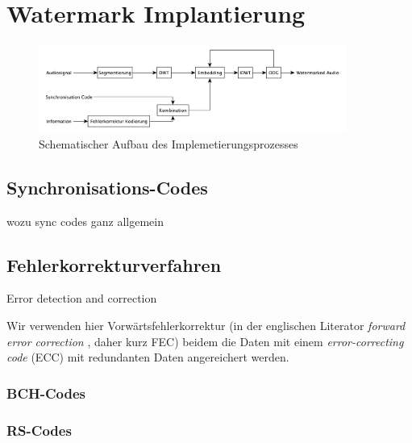 \section{Watermark Implantierung}
\label{sec:embedding}

\begin{figure}[tb]
	\centering
	\includegraphics[width=0.9\textwidth]{figures/diagram-encoder.pdf}
	\caption{Schematischer Aufbau des Implemetierungsprozesses}
	\label{fig:diagram-encoder}
\end{figure}

\subsection{Synchronisations-Codes}

wozu sync codes ganz allgemein

\subsection{Fehlerkorrekturverfahren}
\label{sec:errorcorrection}

Error detection and correction


Wir verwenden hier Vorwärtsfehlerkorrektur  (in der englischen Literator \textit{forward error correction} , daher kurz FEC) beidem die Daten mit einem \textit{error-correcting code}  (ECC) mit redundanten Daten angereichert werden.

\subsubsection{BCH-Codes}

\cite{chang2012location} \cite{huang2002blind}

\subsubsection{RS-Codes}

